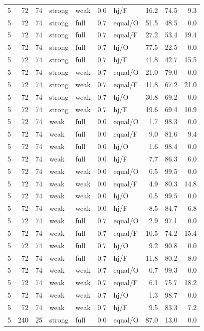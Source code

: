 {\begin{longtable}{@{}rrrllllrrr@{}}
5 & 72 & 74 & strong & weak & 0.0 & hj/F & 16.2 & 74.5 & 9.3\\
5 & 72 & 74 & strong & full & 0.7 & equal/O & 51.5 & 48.5 & 0.0\\
5 & 72 & 74 & strong & full & 0.7 & equal/F & 27.2 & 53.4 & 19.4\\
5 & 72 & 74 & strong & full & 0.7 & hj/O & 77.5 & 22.5 & 0.0\\
5 & 72 & 74 & strong & full & 0.7 & hj/F & 41.8 & 42.7 & 15.5\\
5 & 72 & 74 & strong & weak & 0.7 & equal/O & 21.0 & 79.0 & 0.0\\
5 & 72 & 74 & strong & weak & 0.7 & equal/F & 11.8 & 67.2 & 21.0\\
5 & 72 & 74 & strong & weak & 0.7 & hj/O & 30.8 & 69.2 & 0.0\\
5 & 72 & 74 & strong & weak & 0.7 & hj/F & 19.6 & 69.4 & 10.9\\
5 & 72 & 74 & weak & full & 0.0 & equal/O & 1.7 & 98.3 & 0.0\\
5 & 72 & 74 & weak & full & 0.0 & equal/F & 9.0 & 81.6 & 9.4\\
5 & 72 & 74 & weak & full & 0.0 & hj/O & 1.6 & 98.4 & 0.0\\
5 & 72 & 74 & weak & full & 0.0 & hj/F & 7.7 & 86.3 & 6.0\\
5 & 72 & 74 & weak & weak & 0.0 & equal/O & 0.5 & 99.5 & 0.0\\
5 & 72 & 74 & weak & weak & 0.0 & equal/F & 4.9 & 80.3 & 14.8\\
5 & 72 & 74 & weak & weak & 0.0 & hj/O & 0.5 & 99.5 & 0.0\\
5 & 72 & 74 & weak & weak & 0.0 & hj/F & 8.5 & 84.7 & 6.8\\
5 & 72 & 74 & weak & full & 0.7 & equal/O & 2.9 & 97.1 & 0.0\\
5 & 72 & 74 & weak & full & 0.7 & equal/F & 10.5 & 74.2 & 15.4\\
5 & 72 & 74 & weak & full & 0.7 & hj/O & 9.2 & 90.8 & 0.0\\
5 & 72 & 74 & weak & full & 0.7 & hj/F & 11.8 & 80.2 & 8.0\\
5 & 72 & 74 & weak & weak & 0.7 & equal/O & 0.7 & 99.3 & 0.0\\
5 & 72 & 74 & weak & weak & 0.7 & equal/F & 6.1 & 75.7 & 18.2\\
5 & 72 & 74 & weak & weak & 0.7 & hj/O & 1.3 & 98.7 & 0.0\\
5 & 72 & 74 & weak & weak & 0.7 & hj/F & 9.5 & 83.3 & 7.2\\
5 & 240 & 25 & strong & full & 0.0 & equal/O & 87.0 & 13.0 & 0.0\\

\end{longtable}}
